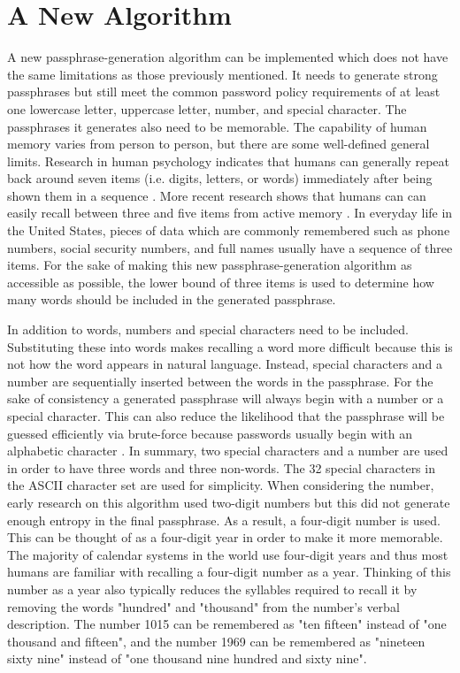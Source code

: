 \documentclass[
	a4paper, %
	10pt, %
	unnumberedsections, %
	twoside, %
]{LTJournalArticle}
\begin{document}
\section{A New Algorithm}
A new passphrase-generation algorithm can be implemented which does not have the same limitations as those previously mentioned. It needs to generate strong passphrases but still meet the common password policy requirements of at least one lowercase letter, uppercase letter, number, and special character. The passphrases it generates also need to be memorable. The capability of human memory varies from person to person, but there are some well-defined general limits. Research in human psychology indicates that humans can generally repeat back around seven items (i.e. digits, letters, or words) immediately after being shown them in a sequence \autocite{magicnumberseven}. More recent research shows that humans can can easily recall between three and five items from active memory \autocite{magicalmysteryfour}. In everyday life in the United States, pieces of data which are commonly remembered such as phone numbers, social security numbers, and full names usually have a sequence of three items. For the sake of making this new passphrase-generation algorithm as accessible as possible, the lower bound of three items is used to determine how many words should be included in the generated passphrase.

In addition to words, numbers and special characters need to be included. Substituting these into words makes recalling a word more difficult because this is not how the word appears in natural language. Instead, special characters and a number are sequentially inserted between the words in the passphrase. For the sake of consistency a generated passphrase will always begin with a number or a special character. This can also reduce the likelihood that the passphrase will be guessed efficiently via brute-force because passwords usually begin with an alphabetic character \autocite{mostcommonpasswords}. In summary, two special characters and a number are used in order to have three words and three non-words. The 32 special characters in the ASCII character set are used for simplicity. When considering the number, early research on this algorithm used two-digit numbers but this did not generate enough entropy in the final passphrase. As a result, a four-digit number is used. This can be thought of as a four-digit year in order to make it more memorable. The majority of calendar systems in the world use four-digit years and thus most humans are familiar with recalling a four-digit number as a year. Thinking of this number as a year also typically reduces the syllables required to recall it by removing the words "hundred" and "thousand" from the number's verbal description. The number 1015 can be remembered as "ten fifteen" instead of "one thousand and fifteen", and the number 1969 can be remembered as "nineteen sixty nine" instead of "one thousand nine hundred and sixty nine".
\end{document}
